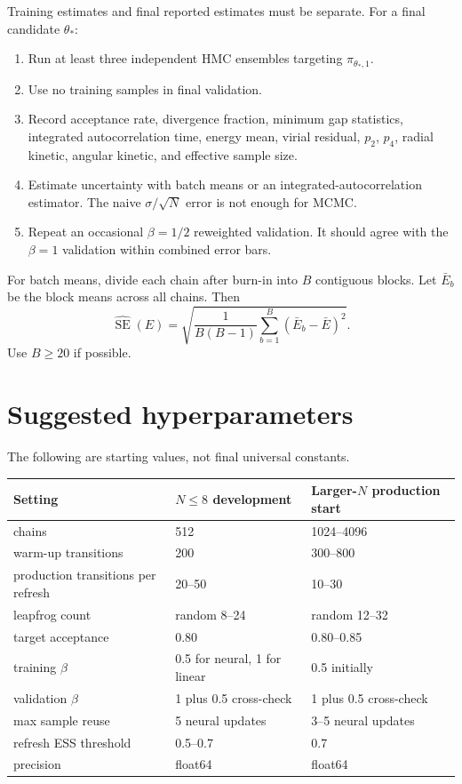 \documentclass[11pt]{article}
\begin{document}
Training estimates and final reported estimates must be separate.  For a final candidate $\theta_*$:
\begin{enumerate}[label=(\roman*)]
\item Run at least three independent HMC ensembles targeting $\pi_{\theta_*,1}$.
\item Use no training samples in final validation.
\item Record acceptance rate, divergence fraction, minimum gap statistics, integrated autocorrelation time, energy mean, virial residual, $p_2$, $p_4$, radial kinetic, angular kinetic, and effective sample size.
\item Estimate uncertainty with batch means or an integrated-autocorrelation estimator.  The naive $\sigma/\sqrt{N}$ error is not enough for MCMC.
\item Repeat an occasional $\beta=1/2$ reweighted validation.  It should agree with the $\beta=1$ validation within combined error bars.
\end{enumerate}

For batch means, divide each chain after burn-in into $B$ contiguous blocks.  Let $\bar E_b$ be the block means across all chains.  Then
\begin{equation}
 \widehat{\operatorname{SE}}(E)=
 \sqrt{\frac{1}{B(B-1)}\sum_{b=1}^B(\bar E_b-\bar E)^2}.
\end{equation}
Use $B\ge 20$ if possible.

\section{Suggested hyperparameters}

The following are starting values, not final universal constants.

\begin{center}
\begin{tabular}{lll}
\toprule
Setting & $N\le 8$ development & Larger-$N$ production start \\
\midrule
chains & 512 & 1024--4096 \\
warm-up transitions & 200 & 300--800 \\
production transitions per refresh & 20--50 & 10--30 \\
leapfrog count & random 8--24 & random 12--32 \\
target acceptance & 0.80 & 0.80--0.85 \\
training $\beta$ & 0.5 for neural, 1 for linear & 0.5 initially \\
validation $\beta$ & 1 plus 0.5 cross-check & 1 plus 0.5 cross-check \\
max sample reuse & 5 neural updates & 3--5 neural updates \\
refresh ESS threshold & 0.5--0.7 & 0.7 \\
precision & float64 & float64 \\
\bottomrule
\end{tabular}
\end{center}
\end{document}
